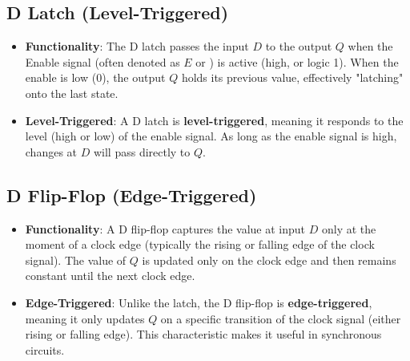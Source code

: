 \documentclass[10pt]{article}
\begin{document}
\begin{multicols}{2}
\subsection{D Latch (Level-Triggered)}
\begin{itemize}
    \item \textbf{Functionality}: The D latch passes the input \( D \) to the output \( Q \) when the Enable signal (often denoted as \( E \) or ) is active (high, or logic 1). When the enable is low (0), the output \( Q \) holds its previous value, effectively "latching" onto the last state.
    \item \textbf{Level-Triggered}: A D latch is \textbf{level-triggered}, meaning it responds to the level (high or low) of the enable signal. As long as the enable signal is high, changes at \( D \) will pass directly to \( Q \).
\end{itemize}

\subsection{D Flip-Flop (Edge-Triggered)}
\begin{itemize}
    \item \textbf{Functionality}: A D flip-flop captures the value at input \( D \) only at the moment of a clock edge (typically the rising or falling edge of the clock signal). The value of \( Q \) is updated only on the clock edge and then remains constant until the next clock edge.
    \item \textbf{Edge-Triggered}: Unlike the latch, the D flip-flop is \textbf{edge-triggered}, meaning it only updates \( Q \) on a specific transition of the clock signal (either rising or falling edge). This characteristic makes it useful in synchronous circuits.
\end{itemize}

\end{multicols}
\end{document}
